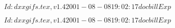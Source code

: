 \documentclass{article}
\begin{document}
$Id: dxxgifs.tex,v 1.4 2001-08-08 19:02:17 docbill Exp $


\pagebreak


$Id: dxxgifs.tex,v 1.4 2001-08-08 19:02:17 docbill Exp $


\pagebreak
\end{document}
